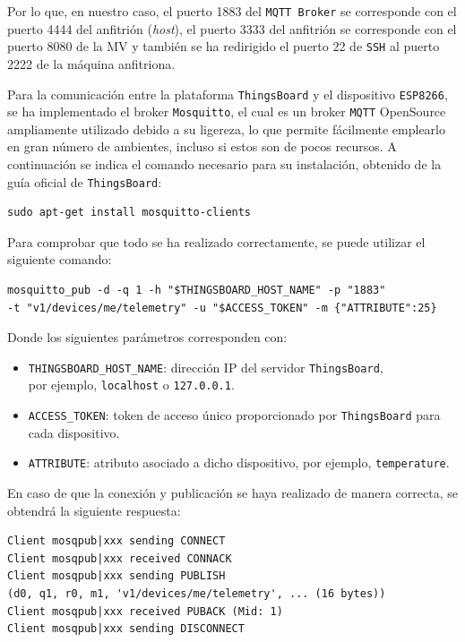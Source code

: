Por lo que, en nuestro caso, el puerto 1883 del \texttt{MQTT Broker} se corresponde con el puerto 4444 del anfitrión (\textit{host}), el puerto 3333 del anfitrión se corresponde con el puerto 8080 de la MV y también se ha redirigido el puerto 22 de \texttt{SSH} al puerto 2222 de la máquina anfitriona.

Para la comunicación entre la plataforma \texttt{ThingsBoard} y el dispositivo \texttt{ESP8266}, se ha implementado el broker \texttt{Mosquitto}, el cual es un broker \texttt{MQTT} OpenSource ampliamente utilizado debido a su ligereza, lo que permite fácilmente emplearlo en gran número de ambientes, incluso si estos son de pocos recursos. A continuación se indica el comando necesario para su instalación, obtenido de la guía oficial de \texttt{ThingsBoard}: \cite{thingsboardMQTTDeviceAPI}

\begin{verbatim}
sudo apt-get install mosquitto-clients
\end{verbatim}

Para comprobar que todo se ha realizado correctamente, se puede utilizar el siguiente comando:
\begin{verbatim}
mosquitto_pub -d -q 1 -h "$THINGSBOARD_HOST_NAME" -p "1883"
-t "v1/devices/me/telemetry" -u "$ACCESS_TOKEN" -m {"ATTRIBUTE":25}
\end{verbatim}

Donde los siguientes parámetros corresponden con:
\begin{itemize}
    \item \texttt{THINGSBOARD\_HOST\_NAME}: dirección IP del servidor \texttt{ThingsBoard}, \\
    por ejemplo, \texttt{localhost} o \texttt{127.0.0.1}.
    \item \texttt{ACCESS\_TOKEN}: token de acceso único proporcionado por \texttt{ThingsBoard} para cada dispositivo.
    \item \texttt{ATTRIBUTE}: atributo asociado a dicho dispositivo, por ejemplo, \texttt{temperature}.
\end{itemize}

En caso de que la conexión y publicación se haya realizado de manera correcta, se obtendrá la siguiente respuesta:
\begin{verbatim}
Client mosqpub|xxx sending CONNECT
Client mosqpub|xxx received CONNACK
Client mosqpub|xxx sending PUBLISH
(d0, q1, r0, m1, 'v1/devices/me/telemetry', ... (16 bytes))
Client mosqpub|xxx received PUBACK (Mid: 1)
Client mosqpub|xxx sending DISCONNECT
\end{verbatim}

